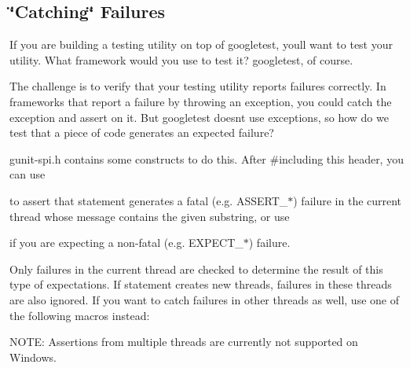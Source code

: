 \subsection*{\char`\"{}\+Catching\char`\"{} Failures}

If you are building a testing utility on top of googletest, you\textquotesingle{}ll want to test your utility. What framework would you use to test it? googletest, of course.

The challenge is to verify that your testing utility reports failures correctly. In frameworks that report a failure by throwing an exception, you could catch the exception and assert on it. But googletest doesn\textquotesingle{}t use exceptions, so how do we test that a piece of code generates an expected failure?

gunit-\/spi.\+h contains some constructs to do this. After \#including this header, you can use


\begin{DoxyCode}{0}
\end{DoxyCode}


to assert that {\ttfamily statement} generates a fatal (e.\+g. {\ttfamily A\+S\+S\+E\+R\+T\+\_\+$\ast$}) failure in the current thread whose message contains the given {\ttfamily substring}, or use


\begin{DoxyCode}{0}
\end{DoxyCode}


if you are expecting a non-\/fatal (e.\+g. {\ttfamily E\+X\+P\+E\+C\+T\+\_\+$\ast$}) failure.

Only failures in the current thread are checked to determine the result of this type of expectations. If {\ttfamily statement} creates new threads, failures in these threads are also ignored. If you want to catch failures in other threads as well, use one of the following macros instead\+:


\begin{DoxyCode}{0}
\end{DoxyCode}


N\+O\+TE\+: Assertions from multiple threads are currently not supported on Windows.

